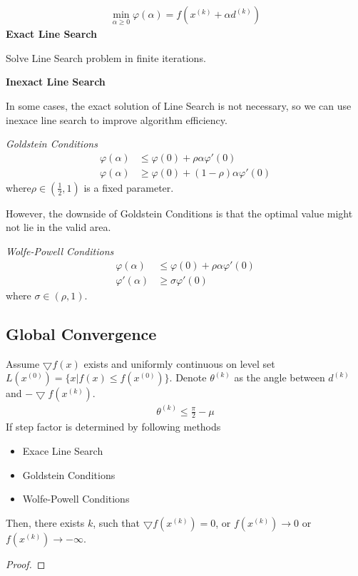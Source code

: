 \documentclass[runningheads]{llncs}
\begin{document}
\begin{align}
    \min_{\alpha \geq 0} \varphi(\alpha) = f(x^{(k)} + \alpha d^{(k)})
\end{align}
\noindent\textbf{Exact Line Search}
\par
Solve Line Search problem in finite iterations.
\par
\noindent\textbf{Inexact Line Search}
\par
In some cases, the exact solution of Line Search
is not necessary, so we can use inexace line search
to improve algorithm efficiency.
\par
\noindent\textit{Goldstein Conditions}
\begin{align}
    \varphi(\alpha) &\leq \varphi(0) + \rho\alpha\varphi'(0) \\
    \varphi(\alpha) &\geq \varphi(0) + (1 - \rho)\alpha\varphi'(0)
\end{align}
where$\rho \in (\frac{1}{2}, 1)$ is a fixed parameter.
\par
However, the downside of Goldstein Conditions
is that the optimal value might not lie in
the valid area.
\par\noindent\textit{Wolfe-Powell Conditions}
\begin{align}
    \varphi(\alpha) &\leq \varphi(0) + \rho\alpha\varphi'(0) \\
    \varphi'(\alpha) &\geq \sigma\varphi'(0)
\end{align}
where $\sigma \in (\rho, 1)$.

\subsection{Global Convergence}
\begin{theorem}
    Assume $\bigtriangledown f(x)$ exists and uniformly continuous
    on level set $L(x^{(0)}) = \{ x | f(x) \leq f(x^{(0)})\}$.
    Denote $\theta^{(k)}$ as the angle between $d^{(k)}$
    and $-\bigtriangledown f(x^{(k)})$.
    \begin{align}
        \theta^{(k)} \leq \frac{\pi}{2} - \mu
    \end{align}
    If step factor is determined by following methods
    \begin{itemize}
        \item Exace Line Search
        \item Goldstein Conditions
        \item Wolfe-Powell Conditions
    \end{itemize}
    Then, there exists $k$, such that $\bigtriangledown f(x^{(k)}) = 0$,
    or $f(x^{(k)}) \rightarrow 0$ or $f(x^{(k)}) \rightarrow - \infty$.
\end{theorem}
\begin{proof}
    
\end{proof}
\end{document}
